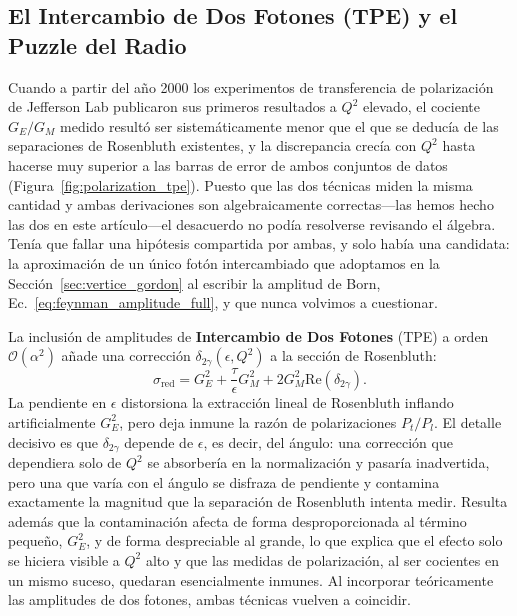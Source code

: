 \documentclass[10pt,a4paper]{article}
\begin{document}
\subsection{El Intercambio de Dos Fotones (TPE) y el Puzzle del Radio}
Cuando a partir del año 2000 los experimentos de transferencia de polarización de Jefferson Lab publicaron sus primeros resultados a $Q^2$ elevado, el cociente $G_E/G_M$ medido resultó ser sistemáticamente menor que el que se deducía de las separaciones de Rosenbluth existentes, y la discrepancia crecía con $Q^2$ hasta hacerse muy superior a las barras de error de ambos conjuntos de datos (Figura~\ref{fig:polarization_tpe}). Puesto que las dos técnicas miden la misma cantidad y ambas derivaciones son algebraicamente correctas---las hemos hecho las dos en este artículo---el desacuerdo no podía resolverse revisando el álgebra. Tenía que fallar una hipótesis compartida por ambas, y solo había una candidata: la aproximación de un único fotón intercambiado que adoptamos en la Sección~\ref{sec:vertice_gordon} al escribir la amplitud de Born, Ec.~\eqref{eq:feynman_amplitude_full}, y que nunca volvimos a cuestionar.

La inclusión de amplitudes de \textbf{Intercambio de Dos Fotones} (TPE) a orden $\mathcal{O}(\alpha^2)$ \cite{blunden2003,arrington2007,carlson2015} añade una corrección $\delta_{2\gamma}(\epsilon, Q^2)$ a la sección de Rosenbluth:
\begin{equation}
\sigma_{\text{red}} = G_E^2 + \frac{\tau}{\epsilon} G_M^2 + 2 G_M^2 \text{Re}(\delta_{2\gamma}).
\end{equation}
La pendiente en $\epsilon$ distorsiona la extracción lineal de Rosenbluth inflando artificialmente $G_E^2$, pero deja inmune la razón de polarizaciones $P_t/P_l$. El detalle decisivo es que $\delta_{2\gamma}$ depende de $\epsilon$, es decir, del ángulo: una corrección que dependiera solo de $Q^2$ se absorbería en la normalización y pasaría inadvertida, pero una que varía con el ángulo se disfraza de pendiente y contamina exactamente la magnitud que la separación de Rosenbluth intenta medir. Resulta además que la contaminación afecta de forma desproporcionada al término pequeño, $G_E^2$, y de forma despreciable al grande, lo que explica que el efecto solo se hiciera visible a $Q^2$ alto y que las medidas de polarización, al ser cocientes en un mismo suceso, quedaran esencialmente inmunes. Al incorporar teóricamente las amplitudes de dos fotones, ambas técnicas vuelven a coincidir.
\end{document}
